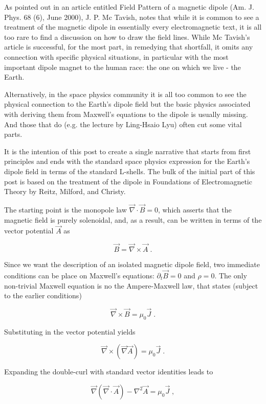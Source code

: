 \documentclass[12pt]{article}
\begin{document}
As pointed out in an article entitled Field Pattern of a magnetic dipole (Am. J. Phys. 68 (6), June 2000), J. P. Mc Tavish, notes that while it is common to see a treatment of the magnetic dipole in essentially every electromagnetic text, it is all too rare to find a discussion on how to draw the field lines.  While Mc Tavish's article is successful, for the most part, in remedying that shortfall, it omits any connection with specific physical situations, in particular with the most important dipole magnet to the human race: the one on which we live - the Earth.

Alternatively, in the space physics community it is all too common to see the physical connection to the Earth's dipole field but the basic physics associated with deriving them from Maxwell's equations to the dipole is usually missing.  And those that do (e.g. the lecture by Ling-Hsaio Lyu) often cut some vital parts. %

It is the intention of this post to create a single narrative that starts from first principles and ends with the standard space physics expression for the Earth's dipole field in terms of the standard L-shells.  The bulk of the initial part of this post is based on the treatment of the dipole in Foundations of Electromagnetic Theory by Reitz, Milford, and Christy.  

The starting point is the monopole law $\vec \nabla \cdot \vec B = 0$, which asserts that the magnetic field is purely solenoidal, and, as a result, can be written in terms of the vector potential $\vec A$ as

\[ \vec B = \vec \nabla \times \vec A \; . \]

Since we want the description of an isolated magnetic dipole field, two immediate conditions can be place on Maxwell's equations:  $\partial_t \vec B = 0$ and $\rho = 0$.  The only non-trivial Maxwell equation is no the Ampere-Maxwell law, that states (subject to the earlier conditions)

\[ \vec \nabla \times \vec B = \mu_0 \vec J \; . \]

Substituting in the vector potential yields

\[ \vec \nabla \times (\vec \nabla \vec A) = \mu_0 \vec J \; .\]

Expanding the double-curl with standard vector identities leads to 

\[ \vec \nabla (\vec \nabla \cdot \vec A) - \nabla^2 \vec A = \mu_0 \vec J \; , \]
\end{document}
